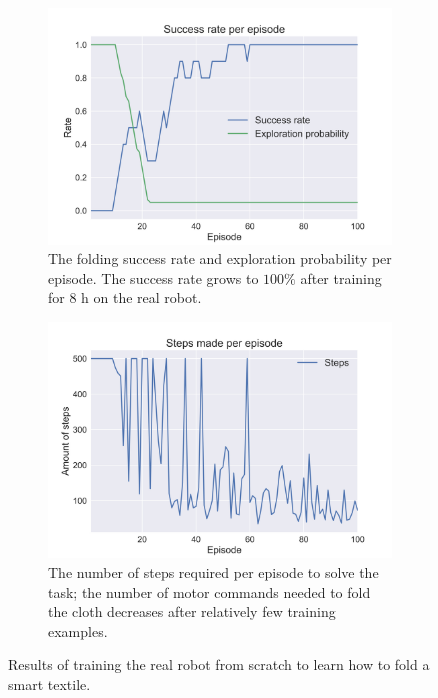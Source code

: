 \documentclass[\home/main.tex]{subfiles}
\begin{document}
\begin{figure}[htpb]{}
    \centering
    \begin{subfigure}[b][]{0.9\textwidth}
        \centering
        \includegraphics[width=\linewidth]{figures/avg-success-rate.jpg}
        \caption{The folding success rate and exploration probability per episode. The success rate grows to $100\%$ after training for $8$ h on the real robot.}
        \label{fig:instrumentation_results_success_rate}
    \end{subfigure}

    \begin{subfigure}[b][]{0.9\textwidth}
        \centering
        \includegraphics[width=\linewidth]{figures/steps.jpg}
        \caption{The number of steps required per episode to solve the task; the number of motor commands needed to fold the cloth decreases after relatively few training examples.}
        \label{fig:instrumentation_results_steps}
    \end{subfigure}

    \caption{Results of training the real robot from scratch to learn how to fold a smart textile.}
    \label{fig:instrumentation_results}
\end{figure}
\end{document}
